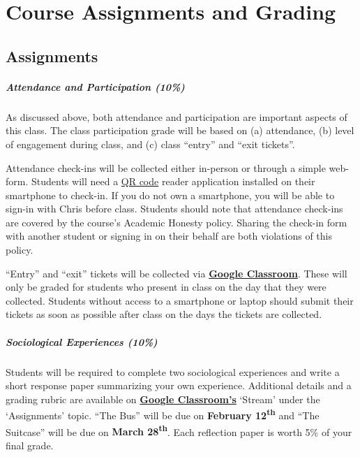 \documentclass{tufte-book}
\begin{document}
\chapter{Course Assignments and Grading}
\section{Assignments}
\paragraph{Attendance and Participation (10\%)} 
As discussed above, both attendance and participation are important aspects of this class. The class participation grade will be based on (a) attendance, (b) level of engagement during class, and (c) class ``entry'' and ``exit tickets''. 

\par Attendance check-ins will be collected either in-person or through a simple web-form. Students will need a \href{https://en.wikipedia.org/wiki/QR_code}{QR code} reader application installed on their smartphone to check-in. If you do not own a smartphone, you will be able to sign-in with Chris before class. Students should note that attendance check-ins are covered by the course's Academic Honesty policy. Sharing the check-in form with another student or signing in on their behalf are both violations of this policy.

\par ``Entry'' and ``exit'' tickets will be collected via \textbf{\href{https://classroom.google.com}{Google Classroom}}. These will only be graded for students who present in class on the day that they were collected. Students without access to a smartphone or laptop should submit their tickets as soon as possible after class on the days the tickets are collected.

\paragraph{Sociological Experiences (10\%)}
Students will be required to complete two sociological experiences and write a short response paper summarizing your own experience. Additional details and a grading rubric are available on \textbf{\href{https://classroom.google.com}{Google Classroom's}} `Stream' under the `Assignments' topic. ``The Bus'' will be due on \textbf{February 12\textsuperscript{th}} and ``The Suitcase'' will be due on \textbf{March 28\textsuperscript{th}}. Each reflection paper is worth 5\% of your final grade.
\end{document}
